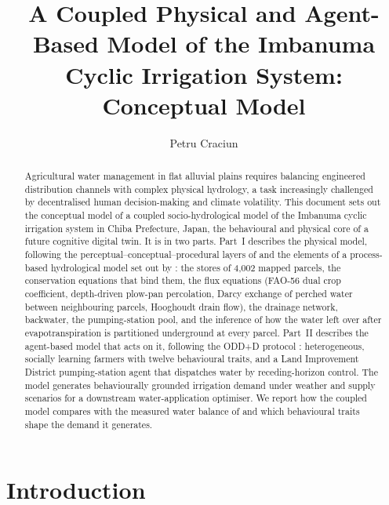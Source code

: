 \documentclass[11pt]{article}
\title{A Coupled Physical and Agent-Based Model of the Imbanuma Cyclic Irrigation System:\\
Conceptual Model}
\author{Petru Craciun}
\date{}
\begin{document}
\maketitle

\begin{abstract}
Agricultural water management in flat alluvial plains requires balancing engineered distribution channels with complex physical hydrology, a task increasingly challenged by decentralised human decision-making and climate volatility. This document sets out the conceptual model of a coupled socio-hydrological model of the Imbanuma cyclic irrigation system in Chiba Prefecture, Japan, the behavioural and physical core of a future cognitive digital twin. It is in two parts. Part~I describes the physical model, following the perceptual--conceptual--procedural layers of \citet{Beven2012} and the elements of a process-based hydrological model set out by \citet{Clark2015}: the stores of 4,002 mapped parcels, the conservation equations that bind them, the flux equations (FAO-56 dual crop coefficient, depth-driven plow-pan percolation, Darcy exchange of perched water between neighbouring parcels, Hooghoudt drain flow), the drainage network, backwater, the pumping-station pool, and the inference of how the water left over after evapotranspiration is partitioned underground at every parcel. Part~II describes the agent-based model that acts on it, following the ODD+D protocol \citep{Mueller2013ODDD}: heterogeneous, socially learning farmers with twelve behavioural traits, and a Land Improvement District pumping-station agent that dispatches water by receding-horizon control. The model generates behaviourally grounded irrigation demand under weather and supply scenarios for a downstream water-application optimiser. We report how the coupled model compares with the measured water balance of \citet{Okura2025WaterBalance} and which behavioural traits shape the demand it generates.
\end{abstract}

\tableofcontents
\newpage

\section{Introduction}
\label{sec:intro}
\end{document}
